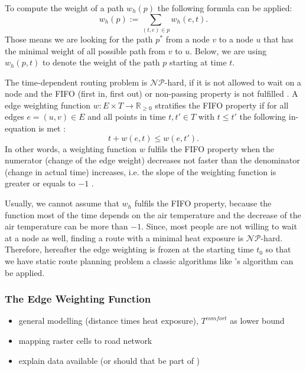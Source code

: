 To compute the weight of a path $w_h(p)$ the following formula can be applied:
	\begin{equation}\label{eq:path-weight}
		w_h(p) := \sum_{(t,e) \in p} w_h(e, t).
	\end{equation}
Those means we are looking for the path $p^*$ from a node $v$ to a node $u$ that has the minimal weight of all possible path from $v$ to $u$. Below, we are using $w_h(p, t)$ to denote the weight of the path $p$ starting at time $t$. 

The time-dependent routing problem is $\mathcal{NP}$-hard, if it is not allowed to wait on a node and the FIFO (first in, first out) or non-passing property is not fulfilled \parencite{Orda1990}. A edge weighting function $w: E \times T \to \mathbb{R}_{\geq 0}$ stratifies the FIFO property if for all edges $e=(u,v)\in E$ and all points in time $t, t' \in T$ with $t \leq t'$ the following in-equation is met \parencite{Ahn1991}:
   \begin{equation}\label{eq:fifo-property}
  	 t + w(e,t) \leq w(e, t').
   \end{equation}
In other words, a weighting function $w$ fulfils the FIFO property when the numerator (change of the edge weight)
decreases not faster than the denominator (change in actual time) increases, i.e. the slope of the weighting function is greater or equals to $-1$ \parencite{Kaufman1993}.  

Usually, we cannot assume that $w_h$ fulfils the FIFO property, because the function most of the time depends on the air temperature and the decrease of the air temperature can be more than $-1$. Since, most people are not willing to wait at a node as well, finding a route with a minimal heat exposure is $\mathcal{NP}$-hard. Therefore, 
hereafter the edge weighting is frozen at the starting time $t_0$ so that we have static route planning problem a classic algorithms like  \citeauthor{Dijkstra1959}'s algorithm \parencite{Dijkstra1959} can be applied. 

\subsubsection{The Edge Weighting Function}

\begin{itemize}
	\item general modelling (distance times heat exposure), $T^{comfort}$ as lower bound
	\item mapping raster cells to road network
	\item explain data available (or should that be part of )
\end{itemize}
 

